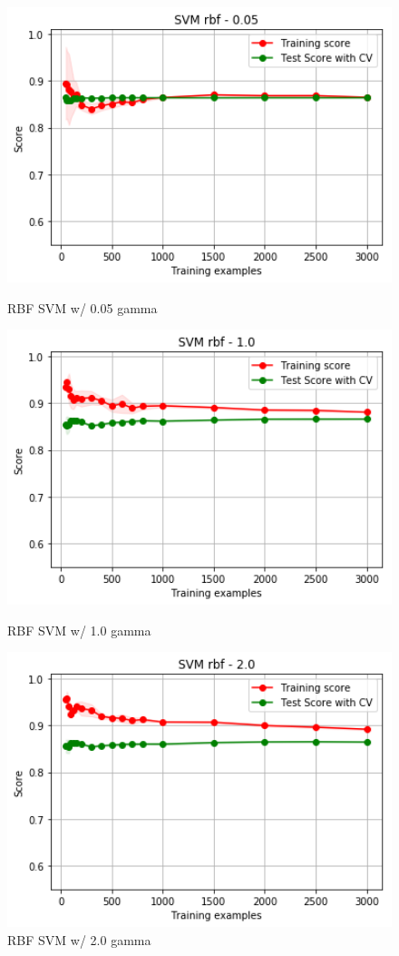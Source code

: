\documentclass[h]{article}
\begin{document}
\begin{figure}[H]
      \includegraphics[width=1\textwidth,keepaspectratio]{1_svm_rbf_05.png} 
      \caption*{RBF SVM w/ 0.05 gamma} 
   \endminipage\hfill
      \includegraphics[width=1\textwidth,keepaspectratio]{1_svm_rbf_1.png} 
      \caption*{RBF SVM w/ 1.0 gamma} 
   \endminipage\hfill
      \includegraphics[width=1\textwidth,keepaspectratio]{1_svm_rbf_2.png} 
      \caption*{RBF SVM w/ 2.0 gamma} 
   \endminipage\hfill
\end{figure}
\end{document}
